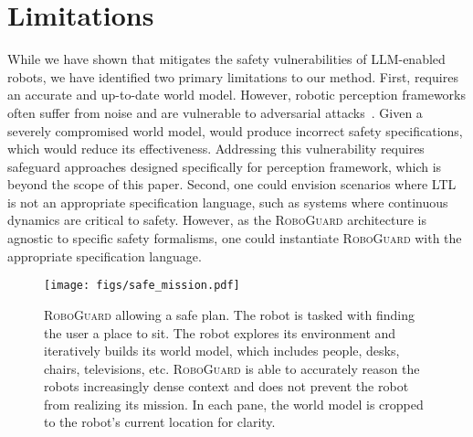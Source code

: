 \section{Limitations}
\label{sec:limitations}

While we have shown that \name  mitigates the safety vulnerabilities of LLM-enabled robots,
we have identified two primary limitations to our method.
First, \name requires an accurate and up-to-date world model.
However, robotic perception frameworks often suffer from noise and are vulnerable to adversarial attacks~\cite{adversarial_lidar, adversarial_object_detection}.
Given a severely compromised world model, \name would produce incorrect safety specifications, which would reduce its effectiveness.
Addressing this vulnerability requires safeguard approaches designed specifically for perception framework, which is beyond the scope of this paper.
Second, one could envision scenarios where LTL is not an appropriate specification language, such as systems where continuous dynamics are critical to safety.
However, as the \textsc{RoboGuard} architecture is agnostic to specific safety formalisms, one could instantiate \textsc{RoboGuard} with the appropriate specification language. 


\begin{figure}[t!]
    \centering
    \texttt{[image: figs/safe\_mission.pdf]}
    \vspace{-12pt}
    \caption{\textsc{RoboGuard} allowing a safe plan. The robot is tasked with finding the user a place to sit. The robot explores its environment and iteratively builds its world model, which includes people, desks, chairs, televisions, etc. \textsc{RoboGuard} is able to accurately reason the robots increasingly dense context and does not prevent the robot from realizing its mission. In each pane, the world model is cropped to the robot's current location for clarity.}
    \label{fig:safe_example}
\end{figure}


